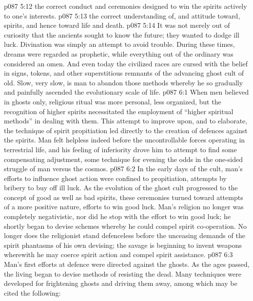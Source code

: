 \vs p087 5:12 \bibnobreakspace {} the correct conduct and ceremonies designed to win the spirits actively to one’s interests.
\vs p087 5:13 \bibnobreakspace {} the correct understanding of, and attitude toward, spirits, and hence toward life and death.
\vs p087 5:14 \pc It was not merely out of curiosity that the ancients sought to know the future; they wanted to dodge ill luck. Divination was simply an attempt to avoid trouble. During these times, dreams were regarded as prophetic, while everything out of the ordinary was considered an omen. And even today the civilized races are cursed with the belief in signs, tokens, and other superstitious remnants of the advancing ghost cult of old. Slow, very slow, is man to abandon those methods whereby he so gradually and painfully ascended the evolutionary scale of life.
\vs p087 6:1 When men believed in ghosts only, religious ritual was more personal, less organized, but the recognition of higher spirits necessitated the employment of “higher spiritual methods” in dealing with them. This attempt to improve upon, and to elaborate, the technique of spirit propitiation led directly to the creation of defences against the spirits. Man felt helpless indeed before the uncontrollable forces operating in terrestrial life, and his feeling of inferiority drove him to attempt to find some compensating adjustment, some technique for evening the odds in the one\hyp{}sided struggle of man versus the cosmos.
\vs p087 6:2 In the early days of the cult, man’s efforts to influence ghost action were confined to propitiation, attempts by bribery to buy off ill luck. As the evolution of the ghost cult progressed to the concept of good as well as bad spirits, these ceremonies turned toward attempts of a more positive nature, efforts to win good luck. Man’s religion no longer was completely negativistic, nor did he stop with the effort to win good luck; he shortly began to devise schemes whereby he could compel spirit co\hyp{}operation. No longer does the religionist stand defenceless before the unceasing demands of the spirit phantasms of his own devising; the savage is beginning to invent weapons wherewith he may coerce spirit action and compel spirit assistance.
\vs p087 6:3 Man’s first efforts at defence were directed against the ghosts. As the ages passed, the living began to devise methods of resisting the dead. Many techniques were developed for frightening ghosts and driving them away, among which may be cited the following:

